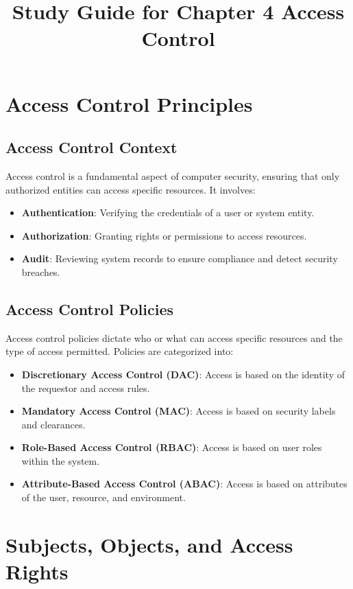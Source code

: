 \documentclass{article}
\title{Study Guide for Chapter 4 Access Control}
\begin{document}
\maketitle


\section{Access Control Principles}
\subsection{Access Control Context}
Access control is a fundamental aspect of computer security, ensuring that only authorized entities can access specific resources. It involves:
\begin{itemize}
    \item \textbf{Authentication}: Verifying the credentials of a user or system entity.
    \item \textbf{Authorization}: Granting rights or permissions to access resources.
    \item \textbf{Audit}: Reviewing system records to ensure compliance and detect security breaches.
\end{itemize}

\subsection{Access Control Policies}
Access control policies dictate who or what can access specific resources and the type of access permitted. Policies are categorized into:
\begin{itemize}
    \item \textbf{Discretionary Access Control (DAC)}: Access is based on the identity of the requestor and access rules.
    \item \textbf{Mandatory Access Control (MAC)}: Access is based on security labels and clearances.
    \item \textbf{Role-Based Access Control (RBAC)}: Access is based on user roles within the system.
    \item \textbf{Attribute-Based Access Control (ABAC)}: Access is based on attributes of the user, resource, and environment.
\end{itemize}

\section{Subjects, Objects, and Access Rights}
\end{document}
